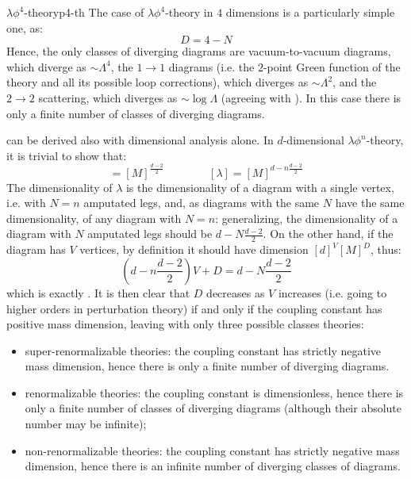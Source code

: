 \begin{example}{$ \lambda \phi^4 $-theory}{p4-th}
  The case of $ \lambda \phi^4 $-theory in $ 4 $ dimensions is a particularly simple one, as:
  \begin{equation}
    D = 4 - N
  \end{equation}
  Hence, the only classes of diverging diagrams are vacuum-to-vacuum diagrams, which diverge as $ \sim \Lambda^4 $, the $ 1 \rightarrow 1 $ diagrams (i.e. the $ 2 $-point Green function of the theory and all its possible loop corrections), which diverges as $ \sim \Lambda^2 $, and the $ 2 \rightarrow 2 $ scattering, which diverges as $ \sim \log \Lambda $ (agreeing with ). In this case there is only a finite number of classes of diverging diagrams.
\end{example}

 can be derived also with dimensional analysis alone. In $ d $-dimensional $ \lambda \phi^n $-theory, it is trivial to show that:
\begin{equation*}
  [\phi] = [M]^{\frac{d - 2}{2}}
  \qquad \qquad
  [\lambda] = [M]^{d - n \frac{d - 2}{2}}
\end{equation*}
The dimensionality of $ \lambda $ is the dimensionality of a diagram with a single vertex, i.e. with $ N = n $ amputated legs, and, as diagrams with the same $ N $ have the same dimensionality, of any diagram with $ N = n $: generalizing, the dimensionality of a diagram with $ N $ amputated legs should be $ d - N \frac{d - 2}{2} $. On the other hand, if the diagram has $ V $ vertices, by definition it should have dimension $ [d]^V [M]^D $, thus:
\begin{equation*}
  \left( d - n \frac{d - 2}{2} \right) V + D = d - N \frac{d - 2}{2}
\end{equation*}
which is exactly . It is then clear that $ D $ decreases as $ V $ increases (i.e. going to higher orders in perturbation theory) if and only if the coupling constant has positive mass dimension, leaving with only three possible classes theories:
\begin{itemize}
  \item super-renormalizable theories: the coupling constant has strictly negative mass dimension, hence there is only a finite number of diverging diagrams.
  \item renormalizable theories: the coupling constant is dimensionless, hence there is only a finite number of classes of diverging diagrams (although their absolute number may be infinite);
  \item non-renormalizable theories: the coupling constant has strictly negative mass dimension, hence there is an infinite number of diverging classes of diagrams.
\end{itemize}

